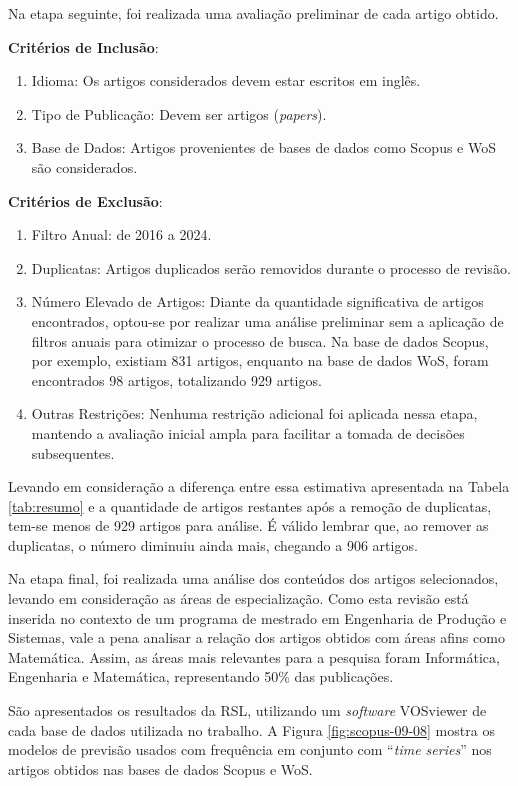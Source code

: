 Na etapa seguinte, foi realizada uma avaliação preliminar de cada artigo obtido.

\textbf{Critérios de Inclusão}:

\begin{enumerate}
	\item Idioma: Os artigos considerados devem estar escritos em inglês.
	\item Tipo de Publicação: Devem ser artigos (\textit{papers}).
	\item Base de Dados: Artigos provenientes de bases de dados como Scopus e WoS são considerados.
\end{enumerate}

\textbf{Critérios de Exclusão}:

\begin{enumerate}
	\item Filtro Anual: de 2016 a 2024.
	\item Duplicatas: Artigos duplicados serão removidos durante o processo de revisão.
	\item Número Elevado de Artigos: Diante da quantidade significativa de artigos encontrados, optou-se por realizar uma análise preliminar sem a aplicação de filtros anuais para otimizar o processo de busca. Na base de dados Scopus, por exemplo, existiam 831 artigos, enquanto na base de dados WoS, foram encontrados 98 artigos, totalizando 929 artigos.
	\item Outras Restrições: Nenhuma restrição adicional foi aplicada nessa etapa, mantendo a avaliação inicial ampla para facilitar a tomada de decisões subsequentes.
\end{enumerate}


Levando em consideração a diferença entre essa estimativa apresentada na Tabela \ref{tab:resumo} e a quantidade de artigos restantes após a remoção de duplicatas, tem-se menos de 929 artigos para análise. É válido lembrar que, ao remover as duplicatas, o número diminuiu ainda mais, chegando a 906 artigos.

Na etapa final, foi realizada uma análise dos conteúdos dos artigos selecionados, levando em consideração as áreas de especialização. Como esta revisão está inserida no contexto de um programa de mestrado em Engenharia de Produção e Sistemas, vale a pena analisar a relação dos artigos obtidos com áreas afins como Matemática. Assim, as áreas mais relevantes para a pesquisa foram Informática, Engenharia e Matemática, representando 50\% das publicações. 

São apresentados os resultados da RSL, utilizando um \textit{software} VOSviewer de cada base de dados utilizada no trabalho. 
A Figura \ref{fig:scopus-09-08} mostra os modelos de previsão usados com frequência em conjunto com ``\textit{time series}'' nos artigos obtidos nas bases de dados Scopus e WoS. 

